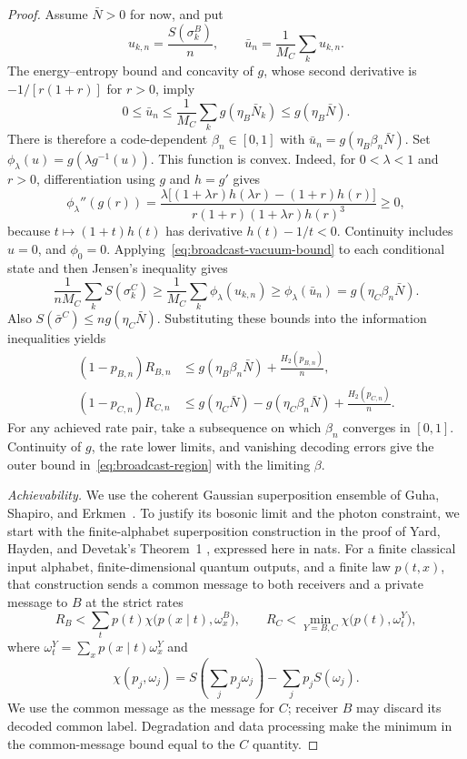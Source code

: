 \begin{proof}
Assume \(\bar N>0\) for now, and put
\[
 u_{k,n}=\frac{S(\sigma_k^B)}n,\qquad
 \bar u_n=\frac1{M_C}\sum_k u_{k,n}.
\]
The energy--entropy bound and concavity of \(g\), whose second derivative
is \(-1/[r(1+r)]\) for \(r>0\), imply
\[
 0\le\bar u_n\le\frac1{M_C}\sum_k g(\eta_B\bar N_k)
 \le g(\eta_B\bar N).
\]
There is therefore a code-dependent \(\beta_n\in[0,1]\) with
\(\bar u_n=g(\eta_B\beta_n\bar N)\).
Set \(\phi_\lambda(u)=g(\lambda g^{-1}(u))\). This function is convex.
Indeed, for \(0<\lambda<1\) and \(r>0\), differentiation using \(g\)
and \(h=g'\) gives
\[
 \phi_\lambda''(g(r))
 =\frac{\lambda\bigl[(1+\lambda r)h(\lambda r)-(1+r)h(r)\bigr]}
 {r(1+r)(1+\lambda r)h(r)^3}\ge0,
\]
because \(t\mapsto(1+t)h(t)\) has derivative \(h(t)-1/t<0\).
Continuity includes \(u=0\), and \(\phi_0=0\).
Applying~\eqref{eq:broadcast-vacuum-bound} to each conditional state and
then Jensen's inequality gives
\[
 \frac1{nM_C}\sum_k S(\sigma_k^C)
 \ge\frac1{M_C}\sum_k\phi_\lambda(u_{k,n})
 \ge\phi_\lambda(\bar u_n)
 =g(\eta_C\beta_n\bar N).
\]
Also \(S(\bar\sigma^C)\le ng(\eta_C\bar N)\). Substituting these bounds
into the information inequalities yields
\[
\begin{aligned}
 (1-p_{B,n})R_{B,n}
 &\le g(\eta_B\beta_n\bar N)+\frac{H_2(p_{B,n})}{n},\\
 (1-p_{C,n})R_{C,n}
 &\le g(\eta_C\bar N)-g(\eta_C\beta_n\bar N)
       +\frac{H_2(p_{C,n})}{n}.
\end{aligned}
\]
For any achieved rate pair, take a subsequence on which
\(\beta_n\) converges in \([0,1]\). Continuity of \(g\), the rate lower
limits, and vanishing decoding errors give the outer bound
in~\eqref{eq:broadcast-region} with the limiting \(\beta\).

\emph{Achievability.}
We use the coherent Gaussian superposition ensemble of Guha, Shapiro,
and Erkmen~\cite[Section~IV]{GSE2007}. To justify its bosonic limit and
the photon constraint, we start with the finite-alphabet superposition
construction in the proof of Yard, Hayden, and Devetak's Theorem~1
\cite[Section~II.A]{YHD2011}, expressed here in nats. For a finite
classical input alphabet, finite-dimensional quantum outputs, and a
finite law \(p(t,x)\), that construction sends a common message to both
receivers and a private message to \(B\) at the strict rates
\[
 R_B<\sum_t p(t)\chi\bigl(p(x\mid t),\omega_x^B\bigr),
 \qquad
 R_C<\min_{Y=B,C}\chi\bigl(p(t),\omega_t^Y\bigr),
\]
where \(\omega_t^Y=\sum_xp(x\mid t)\omega_x^Y\) and
\[
 \chi(p_j,\omega_j)
 =S\!\left(\sum_jp_j\omega_j\right)-\sum_jp_jS(\omega_j).
\]
We use the common message as the message for \(C\); receiver \(B\) may discard
its decoded common label. Degradation and data processing make the
minimum in the common-message bound equal to the \(C\) quantity.


\end{proof}

